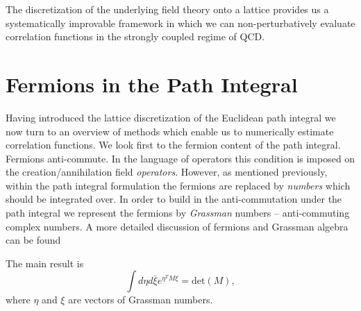 The discretization of the underlying field theory onto a lattice provides us a systematically improvable framework in which we can non-perturbatively evaluate correlation functions in the strongly coupled regime of QCD.




\section{Fermions in the Path Integral} \label{QCD::path_integral}

Having introduced the lattice discretization of the Euclidean path integral we now turn to an overview of methods which enable us to numerically estimate correlation functions. We look first to the fermion content of the path integral. Fermions anti-commute. In the language of operators this condition is imposed on the creation/annihilation field \emph{operators}. However, as mentioned previously, within the path integral formulation the fermions are replaced by \emph{numbers} which should be integrated over. In order to build in the anti-commutation under the path integral we represent the fermions by \emph{Grassman} numbers -- anti-commuting complex numbers.  A more detailed discussion of fermions and Grassman algebra can be found 

The main result  is 
\begin{equation}
\label{eqn:fm_det}
\int d\eta d\bar{\xi}e^{\eta^TM\xi}  = \mathrm{det}(M),
\end{equation}
where $\eta$ and $\xi$ are vectors of Grassman numbers. 
 
